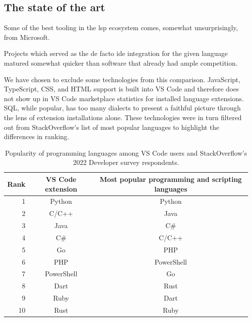 \subsection{The state of the art}

Some of the best tooling in the \acrshort{lsp} ecosystem comes, somewhat
unsurprisingly, from Microsoft.

Projects which served as the de facto \acrshort{ide} integration for the given
language matured somewhat quicker than software that already had ample
competition.


We have chosen to exclude some technologies from this comparison. JavaScript,
TypeScript, CSS, and HTML support is built into VS Code and therefore does not
show up in VS Code marketplace statistics for installed language extensions.
SQL, while popular, has too many dialects to present a faithful picture through
the lens of extension installations alone. These technologies were in turn
filtered out from StackOverflow's list of most popular languages to highlight
the differences in ranking.


\begin{table}\centering
\caption{Popularity of programming languages among VS Code users and
StackOverflow's 2022 Developer survey\cite{stackoverflow_survey_2022}
respondents.}
\begin{tabular}{|r|c|c|}
	Rank & VS Code extension & Most popular programming and scripting languages
	\tabularnewline \hline
	1  & Python     & Python     \tabularnewline
	2  & C/C++      & Java       \tabularnewline
	3  & Java       & C\#        \tabularnewline
	4  & C\#        & C/C++      \tabularnewline
	5  & Go         & PHP        \tabularnewline
	6  & PHP        & PowerShell \tabularnewline
	7  & PowerShell & Go         \tabularnewline
	8  & Dart       & Rust       \tabularnewline
	9  & Ruby       & Dart       \tabularnewline
	10 & Rust       & Ruby       \tabularnewline
\end{tabular}
\end{table}


